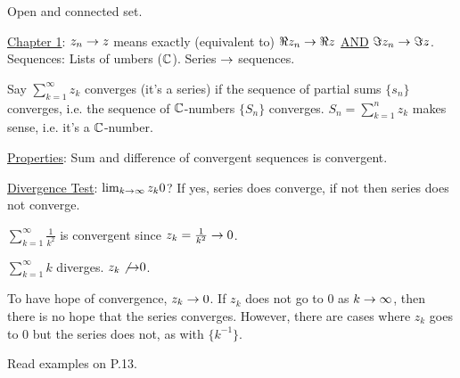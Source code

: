 \documentclass[]{article}
\begin{document}
\begin{definition}
	[Region] Open and connected set.
\end{definition}

\underline{Chapter 1}: $z_n \rightarrow z$ means exactly (equivalent to) $\Re z_n \rightarrow \Re z$ \underline{AND} $\Im z_n \rightarrow \Im z$.
Sequences: Lists of umbers ($\mathbb{C}$).
Series $\rightarrow$ sequences.

\begin{definition}
	Say $\sum_{k=1}^{\infty} z_k$ converges (it's a series) if the sequence of partial sums $\{s_n\}$ converges, i.e. the sequence of $\mathbb{C}$-numbers $\{S_n\}$ converges. $S_n = \sum_{k=1}^{n} z_k$ makes sense, i.e. it's a $\mathbb{C}$-number.
\end{definition}

\underline{Properties}: Sum and difference of convergent sequences is convergent.

\underline{Divergence Test}: $\lim_{k\rightarrow \infty} z_k 0$? If yes, series does converge, if not then series does not converge.

\begin{example}
	$\sum_{k=1}^{\infty} \frac{1}{k^2}$ is convergent since $z_k = \frac{1}{k^2} \rightarrow 0$.
\end{example}

\begin{example}
	$\sum_{k=1}^\infty k$ diverges. $z_k \not{\rightarrow} 0$.
\end{example}

To have hope of convergence, $z_k \rightarrow 0$. If $z_k$ does not go to 0 as $k\rightarrow \infty$, then there is no hope that the series converges. However, there are cases where $z_k$ goes to 0 but the series does not, as with $\{k^{-1}\}$.

Read examples on P.13.
\end{document}
